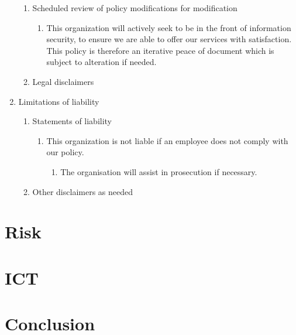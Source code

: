 \begin{enumerate}
  \begin{enumerate}
    \item Scheduled review of policy modifications for modification
    \begin{enumerate}
      \item This organization will actively seek to be in the front of information security, to ensure we are able to offer our services with satisfaction. This policy is therefore an iterative peace of document which is subject to alteration if needed.
    \end{enumerate}
    \item Legal disclaimers
  \end{enumerate}
  \item Limitations of liability
  \begin{enumerate}
    \item Statements of liability
    \begin{enumerate}
      \item This organization is not liable if an employee does not comply with our policy.
      \begin{enumerate}
        \item The organisation will assist in prosecution if necessary.
      \end{enumerate}
    \end{enumerate}
    \item Other disclaimers as needed
  \end{enumerate}
\end{enumerate}


\section{Risk}
\section{ICT}
\section{Conclusion}

